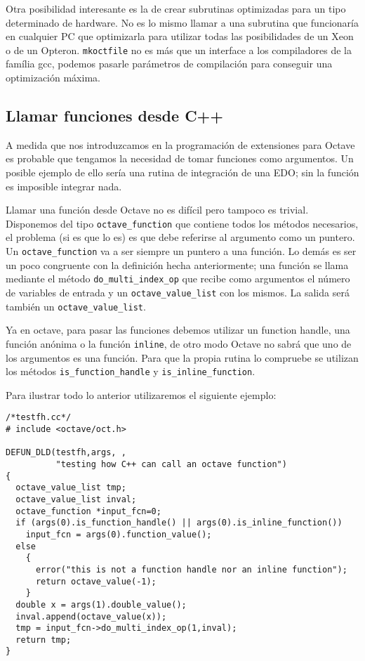 Otra posibilidad interesante es la de crear subrutinas optimizadas
para un tipo determinado de hardware. No es lo mismo llamar a una
subrutina que funcionaría en cualquier PC que optimizarla para
utilizar todas las posibilidades de un Xeon o de un Opteron.
\texttt{mkoctfile} no es más que un interface a los compiladores de la
família gcc, podemos pasarle parámetros de compilación para conseguir
una optimización máxima.

\subsection{Llamar funciones desde C++}

A medida que nos introduzcamos en la programación de extensiones para
Octave es probable que tengamos la necesidad de tomar funciones como
argumentos.  Un posible ejemplo de ello sería una rutina de integración
de una EDO; sin la función es imposible integrar nada.

Llamar una función desde Octave no es difícil pero tampoco es trivial.
Disponemos del tipo \texttt{octave\_function} que contiene todos
los métodos necesarios, el problema (si es que lo es) es que debe
referirse al argumento como un puntero.  Un \texttt{octave\_function} va a ser
siempre un puntero a una función.  Lo demás es ser un poco congruente
con la definición hecha anteriormente; una función se llama
mediante el método \texttt{do\_multi\_index\_op} que recibe como argumentos
el número de variables de entrada y un \texttt{octave\_value\_list} con
los mismos.  La salida será también un \texttt{octave\_value\_list}.

Ya en octave, para pasar las funciones debemos utilizar un function
handle, una función anónima o la función \texttt{inline}, de otro modo
Octave no sabrá que uno de los argumentos es una función.  Para que
la propia rutina lo compruebe se utilizan los métodos 
\texttt{is\_function\_handle} y \texttt{is\_inline\_function}.

Para ilustrar todo lo anterior utilizaremos el siguiente ejemplo:

\begin{verbatim}
/*testfh.cc*/
# include <octave/oct.h>

DEFUN_DLD(testfh,args, ,
          "testing how C++ can call an octave function")
{
  octave_value_list tmp;
  octave_value_list inval;
  octave_function *input_fcn=0;
  if (args(0).is_function_handle() || args(0).is_inline_function())
    input_fcn = args(0).function_value();
  else
    {
      error("this is not a function handle nor an inline function");
      return octave_value(-1);
    }
  double x = args(1).double_value();
  inval.append(octave_value(x));
  tmp = input_fcn->do_multi_index_op(1,inval);
  return tmp;
}
\end{verbatim}

